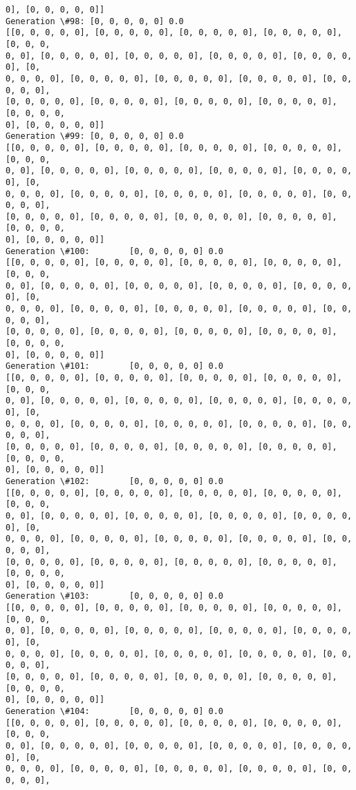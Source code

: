 \documentclass[11pt]{article}
\begin{document}
\begin{Verbatim}[commandchars=\\\{\}]
0], [0, 0, 0, 0, 0]]
Generation \#98: [0, 0, 0, 0, 0] 0.0
[[0, 0, 0, 0, 0], [0, 0, 0, 0, 0], [0, 0, 0, 0, 0], [0, 0, 0, 0, 0], [0, 0, 0,
0, 0], [0, 0, 0, 0, 0], [0, 0, 0, 0, 0], [0, 0, 0, 0, 0], [0, 0, 0, 0, 0], [0,
0, 0, 0, 0], [0, 0, 0, 0, 0], [0, 0, 0, 0, 0], [0, 0, 0, 0, 0], [0, 0, 0, 0, 0],
[0, 0, 0, 0, 0], [0, 0, 0, 0, 0], [0, 0, 0, 0, 0], [0, 0, 0, 0, 0], [0, 0, 0, 0,
0], [0, 0, 0, 0, 0]]
Generation \#99: [0, 0, 0, 0, 0] 0.0
[[0, 0, 0, 0, 0], [0, 0, 0, 0, 0], [0, 0, 0, 0, 0], [0, 0, 0, 0, 0], [0, 0, 0,
0, 0], [0, 0, 0, 0, 0], [0, 0, 0, 0, 0], [0, 0, 0, 0, 0], [0, 0, 0, 0, 0], [0,
0, 0, 0, 0], [0, 0, 0, 0, 0], [0, 0, 0, 0, 0], [0, 0, 0, 0, 0], [0, 0, 0, 0, 0],
[0, 0, 0, 0, 0], [0, 0, 0, 0, 0], [0, 0, 0, 0, 0], [0, 0, 0, 0, 0], [0, 0, 0, 0,
0], [0, 0, 0, 0, 0]]
Generation \#100:        [0, 0, 0, 0, 0] 0.0
[[0, 0, 0, 0, 0], [0, 0, 0, 0, 0], [0, 0, 0, 0, 0], [0, 0, 0, 0, 0], [0, 0, 0,
0, 0], [0, 0, 0, 0, 0], [0, 0, 0, 0, 0], [0, 0, 0, 0, 0], [0, 0, 0, 0, 0], [0,
0, 0, 0, 0], [0, 0, 0, 0, 0], [0, 0, 0, 0, 0], [0, 0, 0, 0, 0], [0, 0, 0, 0, 0],
[0, 0, 0, 0, 0], [0, 0, 0, 0, 0], [0, 0, 0, 0, 0], [0, 0, 0, 0, 0], [0, 0, 0, 0,
0], [0, 0, 0, 0, 0]]
Generation \#101:        [0, 0, 0, 0, 0] 0.0
[[0, 0, 0, 0, 0], [0, 0, 0, 0, 0], [0, 0, 0, 0, 0], [0, 0, 0, 0, 0], [0, 0, 0,
0, 0], [0, 0, 0, 0, 0], [0, 0, 0, 0, 0], [0, 0, 0, 0, 0], [0, 0, 0, 0, 0], [0,
0, 0, 0, 0], [0, 0, 0, 0, 0], [0, 0, 0, 0, 0], [0, 0, 0, 0, 0], [0, 0, 0, 0, 0],
[0, 0, 0, 0, 0], [0, 0, 0, 0, 0], [0, 0, 0, 0, 0], [0, 0, 0, 0, 0], [0, 0, 0, 0,
0], [0, 0, 0, 0, 0]]
Generation \#102:        [0, 0, 0, 0, 0] 0.0
[[0, 0, 0, 0, 0], [0, 0, 0, 0, 0], [0, 0, 0, 0, 0], [0, 0, 0, 0, 0], [0, 0, 0,
0, 0], [0, 0, 0, 0, 0], [0, 0, 0, 0, 0], [0, 0, 0, 0, 0], [0, 0, 0, 0, 0], [0,
0, 0, 0, 0], [0, 0, 0, 0, 0], [0, 0, 0, 0, 0], [0, 0, 0, 0, 0], [0, 0, 0, 0, 0],
[0, 0, 0, 0, 0], [0, 0, 0, 0, 0], [0, 0, 0, 0, 0], [0, 0, 0, 0, 0], [0, 0, 0, 0,
0], [0, 0, 0, 0, 0]]
Generation \#103:        [0, 0, 0, 0, 0] 0.0
[[0, 0, 0, 0, 0], [0, 0, 0, 0, 0], [0, 0, 0, 0, 0], [0, 0, 0, 0, 0], [0, 0, 0,
0, 0], [0, 0, 0, 0, 0], [0, 0, 0, 0, 0], [0, 0, 0, 0, 0], [0, 0, 0, 0, 0], [0,
0, 0, 0, 0], [0, 0, 0, 0, 0], [0, 0, 0, 0, 0], [0, 0, 0, 0, 0], [0, 0, 0, 0, 0],
[0, 0, 0, 0, 0], [0, 0, 0, 0, 0], [0, 0, 0, 0, 0], [0, 0, 0, 0, 0], [0, 0, 0, 0,
0], [0, 0, 0, 0, 0]]
Generation \#104:        [0, 0, 0, 0, 0] 0.0
[[0, 0, 0, 0, 0], [0, 0, 0, 0, 0], [0, 0, 0, 0, 0], [0, 0, 0, 0, 0], [0, 0, 0,
0, 0], [0, 0, 0, 0, 0], [0, 0, 0, 0, 0], [0, 0, 0, 0, 0], [0, 0, 0, 0, 0], [0,
0, 0, 0, 0], [0, 0, 0, 0, 0], [0, 0, 0, 0, 0], [0, 0, 0, 0, 0], [0, 0, 0, 0, 0],

\end{Verbatim}
\end{document}

